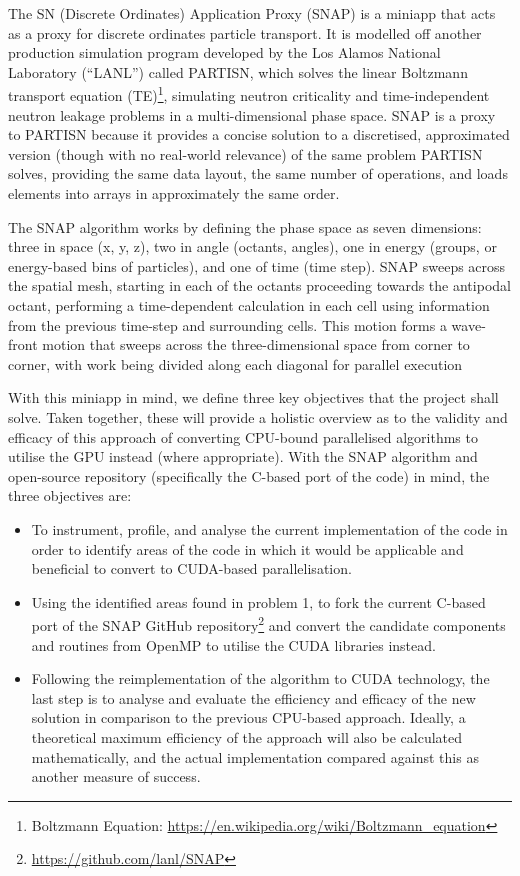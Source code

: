 \documentclass[conference]{IEEEtran}
\begin{document}
The SN (Discrete Ordinates) Application Proxy (SNAP) is a miniapp that acts as a proxy for discrete ordinates particle transport. It is modelled off another production simulation program developed by the Los Alamos National Laboratory (``LANL'') called PARTISN, which solves the linear Boltzmann transport equation (TE)\footnote{Boltzmann Equation: \url{https://en.wikipedia.org/wiki/Boltzmann_equation}\raggedright}, simulating neutron criticality and time-independent neutron leakage problems\cite{partisn} in a multi-dimensional phase space. SNAP is a proxy to PARTISN because it provides a concise solution to a discretised, approximated version (though with no real-world relevance) of the same problem PARTISN solves, providing the same data layout, the same number of operations, and loads elements into arrays in approximately the same order.

The SNAP algorithm works by defining the phase space as seven dimensions: three in space (x, y, z), two in angle (octants, angles), one in energy (groups, or energy-based bins of particles), and one of time (time step). SNAP sweeps across the spatial mesh, starting in each of the octants proceeding towards the antipodal octant, performing a time-dependent calculation in each cell using information from the previous time-step and surrounding cells. This motion forms a wave-front motion that sweeps across the three-dimensional space from corner to corner, with work being divided along each diagonal for parallel execution

With this miniapp in mind, we define three key objectives that the project shall solve. Taken together, these will provide a holistic overview as to the validity and efficacy of this approach of converting CPU-bound parallelised algorithms to utilise the GPU instead (where appropriate). With the SNAP algorithm and open-source repository (specifically the C-based port of the code) in mind, the three objectives are:

\begin{itemize}

\item To instrument, profile, and analyse the current implementation of the code in order to identify areas of the code in which it would be applicable and beneficial to convert to CUDA-based parallelisation.

\item Using the identified areas found in problem 1, to fork the current C-based port of the SNAP GitHub repository\footnote{\url{https://github.com/lanl/SNAP}} and convert the candidate components and routines from OpenMP to utilise the CUDA libraries instead.

\item Following the reimplementation of the algorithm to CUDA technology, the last step is to analyse and evaluate the efficiency and efficacy of the new solution in comparison to the previous CPU-based approach. Ideally, a theoretical maximum efficiency of the approach will also be calculated mathematically, and the actual implementation compared against this as another measure of success.

\end{itemize}
\end{document}
